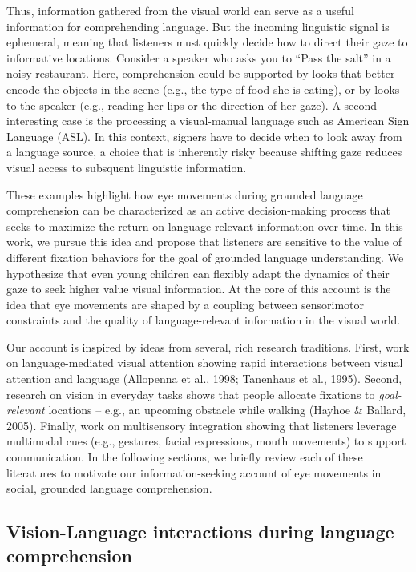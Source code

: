 \documentclass[english,floatsintext,man]{apa6}
\begin{document}
Thus, information gathered from the visual world can serve as a useful
information for comprehending language. But the incoming linguistic
signal is ephemeral, meaning that listeners must quickly decide how to
direct their gaze to informative locations. Consider a speaker who asks
you to \enquote{Pass the salt} in a noisy restaurant. Here,
comprehension could be supported by looks that better encode the objects
in the scene (e.g., the type of food she is eating), or by looks to the
speaker (e.g., reading her lips or the direction of her gaze). A second
interesting case is the processing a visual-manual language such as
American Sign Language (ASL). In this context, signers have to decide
when to look away from a language source, a choice that is inherently
risky because shifting gaze reduces visual access to subsquent
linguistic information.

These examples highlight how eye movements during grounded language
comprehension can be characterized as an active decision-making process
that seeks to maximize the return on language-relevant information over
time. In this work, we pursue this idea and propose that listeners are
sensitive to the value of different fixation behaviors for the goal of
grounded language understanding. We hypothesize that even young children
can flexibly adapt the dynamics of their gaze to seek higher value
visual information. At the core of this account is the idea that eye
movements are shaped by a coupling between sensorimotor constraints and
the quality of language-relevant information in the visual world.

Our account is inspired by ideas from several, rich research traditions.
First, work on language-mediated visual attention showing rapid
interactions between visual attention and language (Allopenna et al.,
1998; Tanenhaus et al., 1995). Second, research on vision in everyday
tasks shows that people allocate fixations to \emph{goal-relevant}
locations -- e.g., an upcoming obstacle while walking (Hayhoe \&
Ballard, 2005). Finally, work on multisensory integration showing that
listeners leverage multimodal cues (e.g., gestures, facial expressions,
mouth movements) to support communication. In the following sections, we
briefly review each of these literatures to motivate our
information-seeking account of eye movements in social, grounded
language comprehension.

\hypertarget{vision-language-interactions-during-language-comprehension}{%
\subsection{Vision-Language interactions during language
comprehension}\label{vision-language-interactions-during-language-comprehension}}
\end{document}
